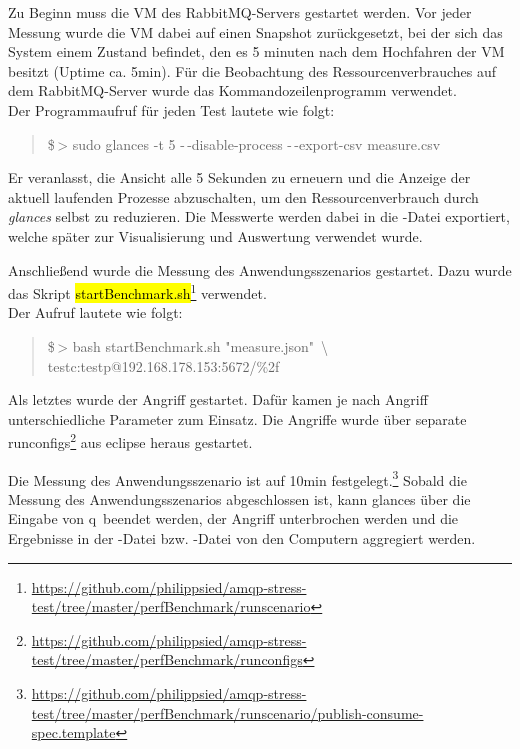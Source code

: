 \documentclass[	a4paper,
			11pt,
			oneside,
			parskip]{scrartcl}
\begin{document}
	Zu Beginn muss die VM des RabbitMQ-Servers gestartet werden. Vor jeder Messung wurde die VM dabei auf einen Snapshot zurückgesetzt, bei der sich das System einem Zustand befindet,
	den es 5 minuten nach dem Hochfahren der VM besitzt (Uptime ca. 5min).
	Für die Beobachtung des Ressourcenverbrauches auf dem RabbitMQ-Server wurde das Kommandozeilenprogramm  verwendet.
	\\Der Programmaufruf für jeden Test lautete wie folgt:
	\begin{quote}
		\ttfamily
		\$\,> sudo glances -t 5 -\,-disable-process -\,-export-csv measure.csv
	\end{quote}
	Er veranlasst, die Ansicht alle 5 Sekunden zu erneuern und die Anzeige der aktuell laufenden Prozesse abzuschalten, um den Ressourcenverbrauch durch \textsl{glances} selbst zu reduzieren.
	Die Messwerte werden dabei in die -Datei exportiert, welche später zur Visualisierung und Auswertung verwendet wurde.
	
	Anschließend wurde die Messung des Anwendungsszenarios gestartet. Dazu wurde das Skript \hl{startBenchmark.sh}\footnote{\url{https://github.com/philippsied/amqp-stress-test/tree/master/perfBenchmark/runscenario}}
	verwendet.\\Der Aufruf lautete wie folgt:
	\begin{quote}
		\ttfamily
		\$\,> bash startBenchmark.sh "measure.json"\ \textbackslash\\ 
		                    \hspace*{6cm} testc:testp@192.168.178.153:5672/\%2f
	\end{quote}
	
	Als letztes wurde der Angriff gestartet. Dafür kamen je nach Angriff unterschiedliche Parameter zum Einsatz. Die Angriffe wurde über separate \glqq runconfigs\grqq\footnote{\url{https://github.com/philippsied/amqp-stress-test/tree/master/perfBenchmark/runconfigs}} aus eclipse heraus gestartet. 
	
	Die Messung des Anwendungsszenario ist auf 10min festgelegt.\footnote{\url{https://github.com/philippsied/amqp-stress-test/tree/master/perfBenchmark/runscenario/publish-consume-spec.template}}
	Sobald die Messung des Anwendungsszenarios abgeschlossen ist, kann glances über die Eingabe von \glqq q\grqq\ beendet werden, der Angriff unterbrochen werden und die Ergebnisse in der -Datei
	bzw. -Datei von den Computern aggregiert werden.
	
\end{document}
